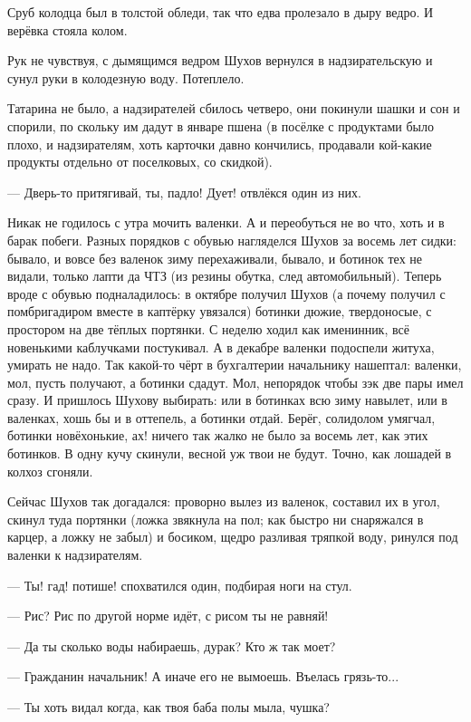 Сруб колодца был в толстой обледи, так что едва пролезало в дыру ведро. И верёвка стояла
колом.

Рук не чувствуя, с дымящимся ведром Шухов вернулся в надзирательскую и сунул руки в
колодезную воду. Потеплело.

Татарина не было, а надзирателей сбилось четверо, они покинули шашки и сон и спорили, по
скольку им дадут в январе пшена (в посёлке с продуктами было плохо, и надзирателям, хоть
карточки давно кончились, продавали кой-какие продукты отдельно от поселковых, со скидкой).

--- Дверь-то притягивай, ты, падло! Дует! \dash отвлёкся один из них.

Никак не годилось с утра мочить валенки. А и переобуться не во что, хоть и в барак побеги.
Разных порядков с обувью нагляделся Шухов за восемь лет сидки: бывало, и вовсе без валенок
зиму перехаживали, бывало, и ботинок тех не видали, только лапти да ЧТЗ (из резины обутка,
след автомобильный). Теперь вроде с обувью подналадилось: в октябре получил Шухов (а почему
получил \dash с помбригадиром вместе в каптёрку увязался) ботинки дюжие, твердоносые, с
простором на две тёплых портянки. С неделю ходил как именинник, всё новенькими каблучками
постукивал. А в декабре валенки подоспели \dash житуха, умирать не надо. Так какой-то чёрт в
бухгалтерии начальнику нашептал: валенки, мол, пусть получают, а ботинки сдадут. Мол,
непорядок \dash чтобы зэк две пары имел сразу. И пришлось Шухову выбирать: или в ботинках всю
зиму навылет, или в валенках, хошь бы и в оттепель, а ботинки отдай. Берёг, солидолом умягчал,
ботинки новёхонькие, ах! \dash ничего так жалко не было за восемь лет, как этих ботинков. В одну
кучу скинули, весной уж твои не будут. Точно, как лошадей в колхоз сгоняли.

Сейчас Шухов так догадался: проворно вылез из валенок, составил их в угол, скинул туда
портянки (ложка звякнула на пол; как быстро ни снаряжался в карцер, а ложку не забыл) и
босиком, щедро разливая тряпкой воду, ринулся под валенки к надзирателям.

--- Ты! гад! потише! \dash спохватился один, подбирая ноги на стул.

--- Рис? Рис по другой норме идёт, с рисом ты не равняй!

--- Да ты сколько воды набираешь, дурак? Кто ж так моет?

--- Гражданин начальник! А иначе его не вымоешь. Въелась грязь-то...

--- Ты хоть видал когда, как твоя баба полы мыла, чушка?

